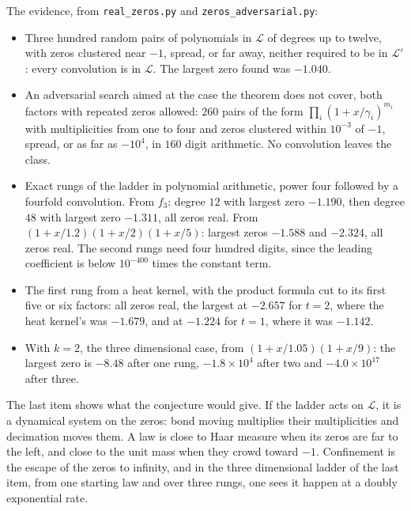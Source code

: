 The evidence, from \texttt{real\_zeros.py} and \texttt{zeros\_adversarial.py}:
\begin{itemize}
\item Three hundred random pairs of polynomials in $\mathcal L$ of degrees up to twelve, with zeros clustered near $-1$, spread, or far away, neither required to be in $\mathcal L'$: every convolution is in $\mathcal L$. The largest zero found was $-1.040$.
\item An adversarial search aimed at the case the theorem does not cover, both factors with repeated zeros allowed: $260$ pairs of the form $\prod_i(1+x/\gamma_i)^{m_i}$ with multiplicities from one to four and zeros clustered within $10^{-3}$ of $-1$, spread, or as far as $-10^4$, in $160$ digit arithmetic. No convolution leaves the class.
\item Exact rungs of the ladder in polynomial arithmetic, power four followed by a fourfold convolution. From $f_3$: degree $12$ with largest zero $-1.190$, then degree $48$ with largest zero $-1.311$, all zeros real. From $(1+x/1.2)(1+x/2)(1+x/5)$: largest zeros $-1.588$ and $-2.324$, all zeros real. The second rungs need four hundred digits, since the leading coefficient is below $10^{-400}$ times the constant term.
\item The first rung from a heat kernel, with the product formula cut to its first five or six factors: all zeros real, the largest at $-2.657$ for $t=2$, where the heat kernel's was $-1.679$, and at $-1.224$ for $t=1$, where it was $-1.142$.
\item With $k=2$, the three dimensional case, from $(1+x/1.05)(1+x/9)$: the largest zero is $-8.48$ after one rung, $-1.8\times10^4$ after two and $-4.0\times10^{17}$ after three.
\end{itemize}

The last item shows what the conjecture would give. If the ladder acts on $\mathcal L$, it is a dynamical system on the zeros: bond moving multiplies their multiplicities and decimation moves them. A law is close to Haar measure when its zeros are far to the left, and close to the unit mass when they crowd toward $-1$. Confinement is the escape of the zeros to infinity, and in the three dimensional ladder of the last item, from one starting law and over three rungs, one sees it happen at a doubly exponential rate.

